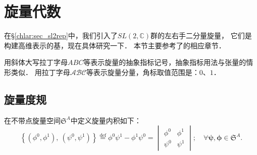 \section{旋量代数}
在\S\ref{chlar:sec_sl2rep}中，我们引入了$SL(2,\mathbb{C})$群的左右手二分量旋量，
它们是构建高维表示的基，现在具体研究一下．
本节主要参考了\parencite{penrose-Rindler1984}的相应章节．

用斜体大写拉丁字母$ABC$等表示旋量的抽象指标记号，抽象指标用法与张量的情形类似．
用拉丁字母$\mathcal{A}\mathcal{B}\mathcal{C}$等表示旋量分量，角标取值范围是：$0$、$1$．



\subsection{旋量度规}

在不带点旋量空间$\mathfrak{S}^A$中定义{\heiti 旋量内积}如下：
\begin{equation} \label{chlar:eqn_S-inner}
\left\{(\phi^0,\phi^1) ,\ (\psi^0,\psi^1)\right\}\overset{\mathrm {def}}{=}   \phi^0 \psi^1 - \phi^1 \psi^0
=\begin{vmatrix} \phi^0 & \phi^1 \\ \psi^0 & \psi^1 \end{vmatrix};
\quad \forall\boldsymbol{\psi} , \boldsymbol{\phi} \in \mathfrak{S}^A.
\end{equation}

